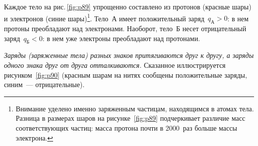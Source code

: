 \documentclass[main.tex]{subfiles}
\begin{document}
Каждое тело на рис.\,\ref{fig:p89} упрощенно составлено из протонов (красные шары) и электронов (синие шары)\footnote{Внимание уделено именно заряженным частицам, находящимся в атомах тела. Разница в размерах шаров на рисунке~\ref{fig:p89} подчеркивает различие масс соответствующих частиц: масса протона почти в 2000~раз больше массы электрона.}. Тело~А имеет положительный заряд~$q_\text{А}>0$: в нем протоны преобладают над электронами. Наоборот, тело~Б несет отрицательный заряд~$q_\text{Б}<0$: в нем уже электроны преобладают над протонами. 


\emph{Заряды (заряженные тела) разных знаков притягиваются друг к другу, а заряды одного знака друг от друга отталкиваются.} Сказанное иллюстрируется рисунком~\ref{fig:p90} (красным шарам на нитях сообщены положительные заряды, синим~--- отрицательные).
\end{document}
